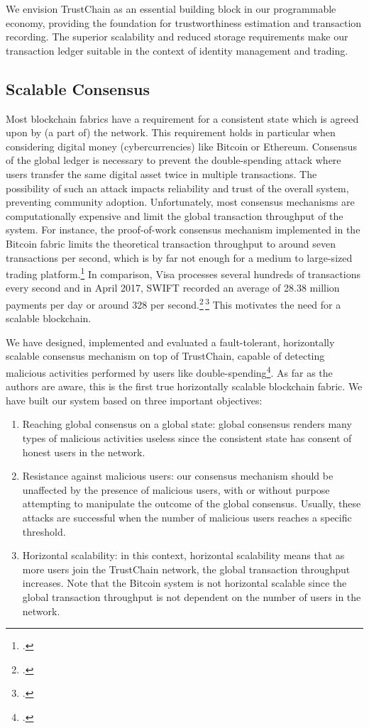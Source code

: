 \documentclass[USenglish]{article}
\begin{document}
We envision TrustChain as an essential building block in our programmable economy, providing the foundation for trustworthiness estimation and transaction recording.
The superior scalability and reduced storage requirements make our transaction ledger suitable in the context of identity management and trading.

\subsection{Scalable Consensus}
\label{sec:scalable_consensus}
Most blockchain fabrics have a requirement for a consistent state which is agreed upon by (a part of) the network.
This requirement holds in particular when considering digital money (cybercurrencies) like Bitcoin or Ethereum.
Consensus of the global ledger is necessary to prevent the double-spending attack where users transfer the same digital asset twice in multiple transactions.
The possibility of such an attack impacts reliability and trust of the overall system, preventing community adoption.
Unfortunately, most consensus mechanisms are computationally expensive and limit the global transaction throughput of the system.
For instance, the proof-of-work consensus mechanism implemented in the Bitcoin fabric limits the theoretical transaction throughput to around seven transactions per second, which is by far not enough for a medium to large-sized trading platform.\footcite{duebitcoinscale}
In comparison, Visa processes several hundreds of transactions every second and in April 2017, SWIFT recorded an average of 28.38 million payments per day or around 328 per second.\footcite{visatransactions}\,\footcite{swifttransactions}
This motivates the need for a scalable blockchain.

We have designed, implemented and evaluated a fault-tolerant, horizontally scalable consensus mechanism on top of TrustChain, capable of detecting malicious activities performed by users like double-spending\footcite{ren2017implicit}.
As far as the authors are aware, this is the first true horizontally scalable blockchain fabric.
We have built our system based on three important objectives:
\begin{enumerate}
	\item Reaching global consensus on a global state: global consensus renders many types of malicious activities useless since the consistent state has consent of honest users in the network.
	\item Resistance against malicious users: our consensus mechanism should be unaffected by the presence of malicious users, with or without purpose attempting to manipulate the outcome of the global consensus. Usually, these attacks are successful when the number of malicious users reaches a specific threshold.
	\item Horizontal scalability: in this context, horizontal scalability means that as more users join the TrustChain network, the global transaction throughput increases. Note that the Bitcoin system is not horizontal scalable since the global transaction throughput is not dependent on the number of users in the network.
\end{enumerate}
\end{document}
